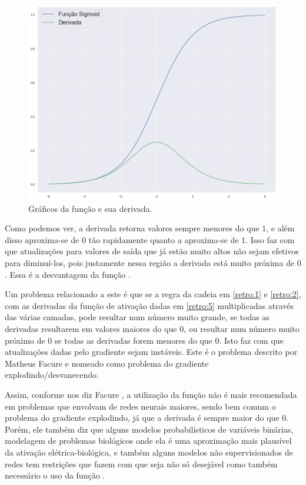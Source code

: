 \begin{figure}[htb]
\centering
\includegraphics[width=12cm]{figuras/der_sigm}
\caption{Gráficos da função  e sua derivada.}
\label{fig:der_sigm}
\end{figure}

Como podemos ver, a derivada retorna valores sempre menores do que $1$, e além disso aproxima-se de $0$ tão rapidamente quanto a  aproxima-se de $1$. Isso faz com que atualizações para valores de saída que já estão muito altos não sejam efetivos para diminuí-los, pois justamente nessa região a derivada está muito próxima de $0$. Essa é a desvantagem da função .

Um problema relacionado a este é que se a regra da cadeia em \ref{retro:1} e \ref{retro:2}, com as derivadas da função de ativação dadas em \ref{retro:5} multiplicadas através das várias camadas, pode resultar num número muito grande, se todas as derivadas resultarem em valores maiores do que $0$, ou resultar num número muito próximo de $0$ se todas as derivadas forem menores do que $0$. Isto faz com que atualizações dadas pelo gradiente sejam instáveis. Este é o problema descrito por Matheus Facure \citep{matheus_2} e nomeado como problema do gradiente explodindo/desvanecendo.

Assim, conforme nos diz Facure \citep{matheus}, a utilização da função  não é mais recomendada em problemas que envolvam de redes neurais maiores, sendo bem comum o problema do gradiente explodindo, já que a derivada é sempre maior do que $0$. Porém, ele também diz que alguns modelos probabilísticos de variáveis binárias, modelagem de problemas biológicos onde ela é uma aproximação mais plausível da ativação elétrica-biológica, e também alguns modelos não supervisionados de redes tem restrições que fazem com que seja não só desejável como também necessário o uso da função .

